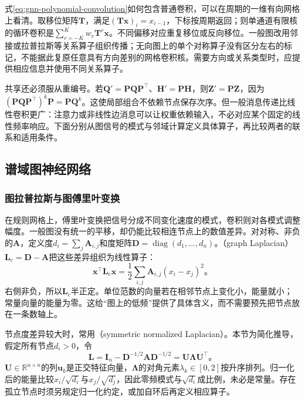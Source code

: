 式\eqref{eq:gnn-polynomial-convolution}如何包含普通卷积，可以在周期的一维有向网格上看清。取移位矩阵$\bm{T}$，满足$(\bm{T}\bm{x})_i=x_{i-1}$，下标按周期返回；则单通道有限核的循环卷积是$\sum_{r=-K}^{K}w_r\bm{T}^{r}\bm{x}$。不同偏移对应重复移位或反向移位。一般图改用邻接或拉普拉斯等关系算子组织传播；无向图上的单个对称算子没有区分左右的标记，不能据此复原任意具有方向差别的网格卷积核。需要方向或关系类型时，应提供相应信息并使用不同关系算子。

共享还必须服从重编号。若$\bm{Q}'=\bm{P}\bm{Q}\bm{P}^{\top}$、$\bm{H}'=\bm{P}\bm{H}$，则$\bm{Z}'=\bm{P}\bm{Z}$，因为$(\bm{P}\bm{Q}\bm{P}^{\top})^k\bm{P}=\bm{P}\bm{Q}^k$。这使局部组合不依赖节点保存次序。但一般消息传递比线性卷积更广：注意力或非线性边消息可以让权重依赖输入，不必对应某个固定的线性频率响应。下面分别从图信号的模式与邻域计算定义具体算子，再比较两者的联系和适用条件。

\subsection{谱域图神经网络}
\label{sec:gnn-spectral}

\subsubsection{图拉普拉斯与图傅里叶变换}
\label{sec:gnn-graph-fourier}

在规则网格上，傅里叶变换把信号分成不同变化速度的模式，卷积则对各模式调整幅度。一般图没有统一的平移，却仍能比较相连节点上的数值差异。对对称、非负的$\bm{A}$，定义度$d_i=\sum_j\bm{A}_{i,j}$和度矩阵$\bm{D}=\operatorname{diag}(d_1,\ldots,d_n)$。（graph Laplacian）$\bm{L}_{\mathrm{c}}=\bm{D}-\bm{A}$把这些差异组织为线性算子：
\begin{equation}
  \bm{x}^{\top}\bm{L}_{\mathrm{c}}\bm{x}
    =\frac{1}{2}\sum_{i,j}\bm{A}_{i,j}(x_i-x_j)^2\text{。}
  \label{eq:gnn-laplacian-energy}
\end{equation}
右侧非负，所以$\bm{L}_{\mathrm{c}}$半正定。单位范数的向量若在相邻节点上变化小，能量就小；常量向量的能量为零。这给“图上的低频”提供了具体含义，而不需要预先把节点放在一条数轴上。

节点度差异较大时，常用（symmetric normalized Laplacian）。本节为简化推导，假定所有节点$d_i>0$，令
\begin{equation}
  \bm{L}=\bm{I}_n-\bm{D}^{-1/2}\bm{A}\bm{D}^{-1/2}
    =\bm{U}\bm{\Lambda}\bm{U}^{\top}\text{。}
  \label{eq:gnn-laplacian-spectrum}
\end{equation}
$\bm{U}\in\mathbb{R}^{n\times n}$的列$\bm{u}_k$是正交特征向量，$\bm{\Lambda}$的对角元素$\lambda_k\in[0,2]$按升序排列。归一化后的能量比较$x_i/\sqrt{d_i}$与$x_j/\sqrt{d_j}$，因此零频模式与$\sqrt{d_i}$成比例，未必是常量。存在孤立节点时须另规定归一化约定，或加自环后再定义相应算子。

